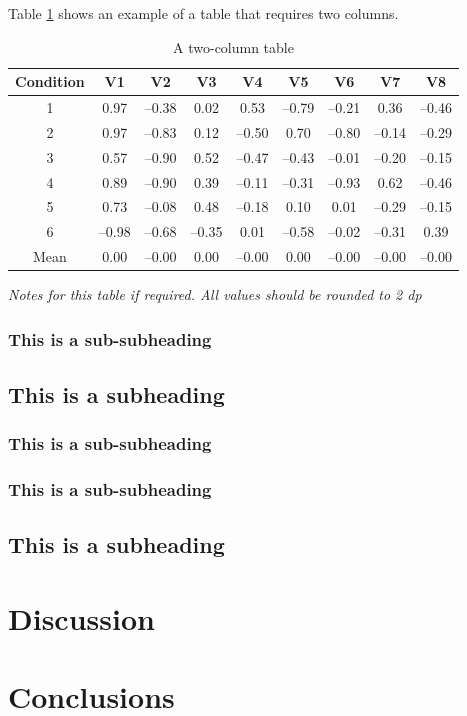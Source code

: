 \documentclass[paper=a4,fontsize=11pt,twocolumn]{article}
\begin{document}
Table \ref{tab:two-column} shows an example of a table that requires two columns.

\begin{table}
\begin{centering}
\caption{A two-column table}\label{tab:two-column}%
	\begin{tabular}[\columnwidth]{ccccccccc}\toprule
	Condition & V1 & V2 & V3 & V4 & V5 & V6 & V7 & V8 \\
	\midrule
	1 & 0.97 & --0.38 & 0.02 & 0.53 & --0.79 & --0.21 & 0.36 & --0.46 \\
	2 & 0.97 & --0.83 & 0.12 & --0.50 & 0.70 & --0.80 & --0.14 & --0.29 \\
	3 & 0.57 & --0.90 & 0.52 & --0.47 & --0.43 & --0.01 & --0.20 & --0.15 \\
	4 & 0.89 & --0.90 & 0.39 & --0.11 & --0.31 & --0.93 & 0.62 & --0.46 \\
	5 & 0.73 & --0.08 & 0.48 & --0.18 & 0.10 & 0.01 & --0.29 & --0.15 \\
	6 & --0.98 & --0.68 & --0.35 & 0.01 & --0.58 & --0.02 & --0.31 & 0.39 \\
	\cmidrule{2-9}
	Mean & 0.00 & --0.00 & 0.00 & --0.00 & 0.00 & --0.00 & --0.00 & --0.00 \\
	\bottomrule
	\end{tabular}\par
	\medskip
\textit{Notes for this table if required. All values should be rounded to 2 dp}
\end{centering}
\end{table}

\lipsum[12]
\subsubsection{This is a sub-subheading}
\lipsum[13]

\subsection{This is a subheading}
\subsubsection{This is a sub-subheading}
\lipsum[14]
\subsubsection{This is a sub-subheading}
\lipsum[15]

\subsection{This is a subheading}
\lipsum[16-18]

\section{Discussion}
\lipsum[19-23]

\section{Conclusions}
\lipsum[24-32]


\end{document}

